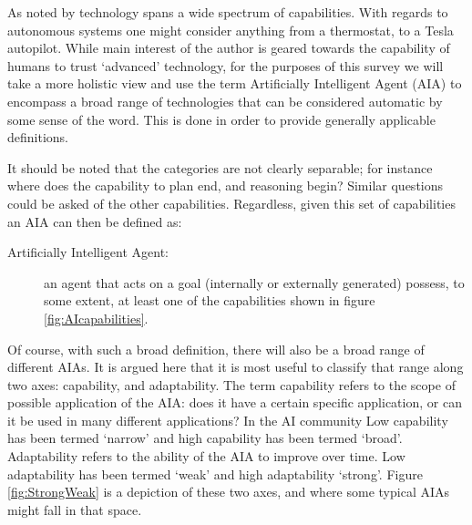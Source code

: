    As noted by \citet{Tripp2011-cq} technology spans a wide spectrum of capabilities. With regards to autonomous systems one might consider anything from a thermostat, to a Tesla autopilot. While main interest of the author is geared towards the capability of humans to trust `advanced' technology, for the purposes of this survey we will take a more holistic view and use the term Artificially Intelligent Agent (AIA) to encompass a broad range of technologies that can be considered automatic by some sense of the word. This is done in order to provide generally applicable definitions.

    It should be noted that the categories are not clearly separable; for instance where does the capability to plan end, and reasoning begin? Similar questions could be asked of the other capabilities. Regardless, given this set of capabilities an AIA can then be defined as:
    
    \begin{description}
        \item[Artificially Intelligent Agent:] an agent that acts on a goal (internally or externally generated) possess, to some extent, at least one of the capabilities shown in figure \ref{fig:AIcapabilities}.
    \end{description}

    Of course, with such a broad definition, there will also be a broad range of different AIAs. It is argued here that it is most useful to classify that range along two axes: capability, and adaptability. The term capability refers to the scope of possible application of the AIA: does it have a certain specific application, or can it be used in many different applications? In the AI community Low capability has been termed `narrow' and high capability has been termed `broad'. Adaptability refers to the ability of the AIA to improve over time. Low adaptability has been termed `weak' and high adaptability `strong'. Figure \ref{fig:StrongWeak} is a depiction of these two axes, and where some typical AIAs might fall in that space.

